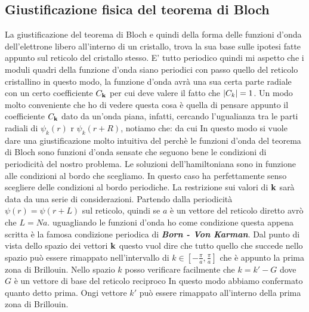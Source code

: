 \documentclass[a4paper,12pt]{article}
\begin{document}
\subsection{Giustificazione fisica del teorema di Bloch}
La giustificazione del teorema di Bloch e quindi della forma delle funzioni d'onda dell'elettrone libero all'interno di un cristallo, trova la sua base sulle ipotesi fatte appunto sul reticolo del cristallo stesso. E' tutto periodico quindi mi aspetto che i moduli quadri della funzione d'onda siano periodici con passo quello del reticolo cristallino
in questo modo, la funzione d'onda avrà una sua certa parte radiale con un certo coefficiente $C_{\it\bf k}$ per cui deve valere il fatto che $\abs{C_k} =1$. Un modo molto conveniente che ho di vedere questa cosa è quella di pensare appunto il coefficiente $C_{\it\bf k}$ dato da un'onda piana, infatti, cercando l'ugualianza tra le parti radiali di $\psi_k(r)$ r $\psi_k(r+R)$, notiamo che:
da cui
In questo modo si vuole dare una giustificazione molto intuitiva del perchè le funzioni d'onda del teorema di Bloch sono funzioni d'onda sensate che seguono bene le condizioni di periodicità del nostro problema. Le soluzioni dell'hamiltoniana sono in funzione alle condizioni al bordo che scegliamo. In questo caso ha perfettamente senso scegliere delle condizioni al bordo periodiche. La restrizione sui valori di $\it\bf k$ sarà data da una serie di considerazioni. Partendo dalla periodicità $\psi(r) = \psi(r+L)$ sul reticolo, quindi se $a$ è un vettore del reticolo diretto avrò che $L = Na$. uguagliando le funzioni d'onda
ho come condizione
questa appena scritta è la famosa condizione periodica di \textit{\textbf{Born - Von Karman}}. Dal punto di vista dello spazio dei vettori $\it\bf k$ questo vuol dire che tutto quello che succede nello spazio può essere rimappato nell'intervallo di $k\in\left[-\frac{\pi}{a},\frac{\pi}{a}\right]$ che è appunto la prima zona di Brillouin. Nello spazio $k$ posso verificare facilmente che $k = k'-G$ dove $G$ è un vettore di base del reticolo reciproco
In questo modo abbiamo confermato quanto detto prima. Ongi vettore $k'$ può essere rimappato all'interno della prima zona di Brillouin.
\end{document}
